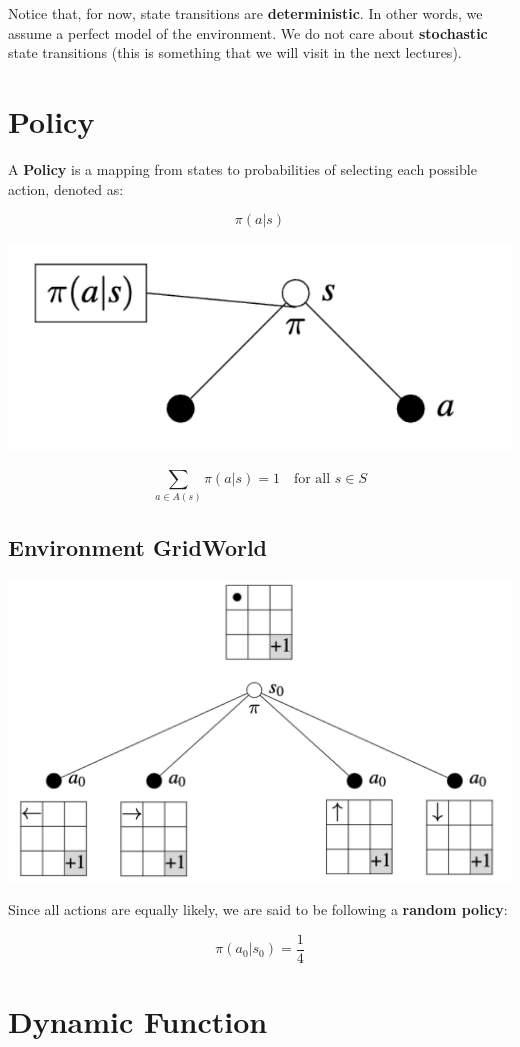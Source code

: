 \documentclass[
  letterpaper,
  DIV=11,
  numbers=noendperiod]{scrreprt}
\begin{document}
Notice that, for now, state transitions are \textbf{deterministic}. In
other words, we assume a perfect model of the environment. We do not
care about \textbf{stochastic} state transitions (this is something that
we will visit in the next lectures).

\section{Policy}\label{policy}

A \textbf{Policy} is a mapping from states to probabilities of selecting
each possible action, denoted as:

\[
\pi(a|s)
\]

\begin{center}
\includegraphics[width=0.35\linewidth,height=\textheight,keepaspectratio]{lecture4/images/Policy.png}
\end{center}

\[
\sum_{a \in A(s)} \pi(a|s) = 1 \quad \text{for all } s \in S
\]

\subsection{Environment GridWorld}\label{environment-gridworld-2}

\begin{center}
\includegraphics[width=0.55\linewidth,height=\textheight,keepaspectratio]{lecture4/images/GridWorld-Policy.png}
\end{center}

Since all actions are equally likely, we are said to be following a
\textbf{random policy}:

\[
\pi(a_0|s_0) = \frac{1}{4}
\]

\section{Dynamic Function}\label{dynamic-function}
\end{document}
